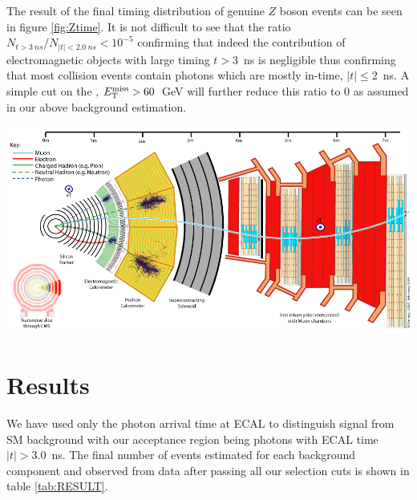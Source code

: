 The result of the final timing distribution of genuine $Z$ boson events  can be seen in figure \ref{fig:Ztime}. It is not difficult to see that the ratio $ N_{t > 3~ns}/ N_{|t| < 2.0~ns}  < 10^{-5}$ confirming that indeed the contribution  of electromagnetic objects with large timing $t >3$~ns is negligible thus confirming that most collision events contain photons which are mostly in-time, $|t| \leq 2$~ns. A simple cut on the \MET, $E_{\mathrm{T}}^{\text{miss}} > 60$~GeV will further reduce this ratio to $0$ as assumed in our above background estimation.
\begin{center}
\centering
\includegraphics[scale=0.2]{THESISPLOTS/CMS_Slice.png}
\label{fig:Ztime}
\end{center}
  


\section{Results}
We have used only the photon arrival time at ECAL to distinguish signal from SM background with our acceptance region being photons with ECAL time $|t| > 3.0$~ns. The final number of events estimated for each background component and observed from data after passing all our selection cuts is shown in table \ref{tab:RESULT}.

